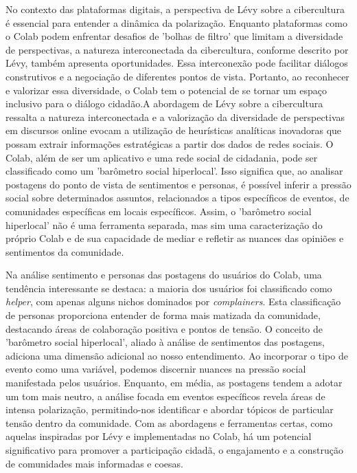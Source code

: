 No contexto das plataformas digitais, a perspectiva de Lévy sobre a cibercultura é essencial para entender a dinâmica da polarização. Enquanto plataformas como o Colab podem enfrentar desafios de 'bolhas de filtro' que limitam a diversidade de perspectivas, a natureza interconectada da cibercultura, conforme descrito por Lévy, também apresenta oportunidades. Essa interconexão pode facilitar diálogos construtivos e a negociação de diferentes pontos de vista. Portanto, ao reconhecer e valorizar essa diversidade, o Colab tem o potencial de se tornar um espaço inclusivo para o diálogo cidadão.A abordagem de Lévy sobre a cibercultura ressalta a natureza interconectada e a valorização da diversidade de perspectivas em discursos online evocam a utilização de heurísticas analíticas inovadoras que possam extrair informações estratégicas a partir dos dados de redes sociais. O Colab, além de ser um aplicativo e uma rede social de cidadania, pode ser classificado como um 'barômetro social hiperlocal'. Isso significa que, ao analisar postagens do ponto de vista de sentimentos e personas, é possível inferir a pressão social sobre determinados assuntos, relacionados a tipos específicos de eventos, de comunidades específicas em locais específicos. Assim, o 'barômetro social hiperlocal' não é uma ferramenta separada, mas sim uma caracterização do próprio Colab e de sua capacidade de mediar e refletir as nuances das opiniões e sentimentos da comunidade.

Na análise sentimento e personas das postagens do usuários do Colab, uma tendência interessante se destaca: a maioria dos usuários foi classificado como \textit{helper}, com apenas alguns nichos dominados por \textit{complainers}. Esta classificação de personas proporciona entender de forma mais matizada da comunidade, destacando áreas de colaboração positiva e pontos de tensão. O conceito de 'barômetro social hiperlocal', aliado à análise de sentimentos das postagens, adiciona uma dimensão adicional ao nosso entendimento. Ao incorporar o tipo de evento como uma variável, podemos discernir nuances na pressão social manifestada pelos usuários. Enquanto, em média, as postagens tendem a adotar um tom mais neutro, a análise focada em eventos específicos revela áreas de intensa polarização, permitindo-nos identificar e abordar tópicos de particular tensão dentro da comunidade. Com as abordagens e ferramentas certas, como aquelas inspiradas por Lévy e implementadas no Colab, há um potencial significativo para promover a participação cidadã, o engajamento e a construção de comunidades mais informadas e coesas.

